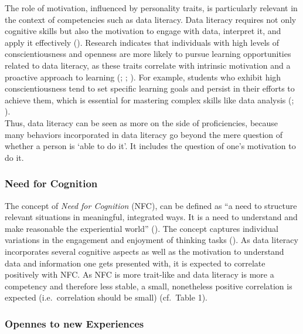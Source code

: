 \documentclass[
  12pt,
  a4paper,
  twoside]{article}
\begin{document}
The role of motivation, influenced by personality traits, is particularly relevant in the context of competencies such as data literacy.
Data literacy requires not only cognitive skills but also the motivation to engage with data, interpret it, and apply it effectively ().
Research indicates that individuals with high levels of conscientiousness and openness are more likely to pursue learning opportunities related to data literacy, as these traits correlate with intrinsic motivation and a proactive approach to learning (; ; ).
For example, students who exhibit high conscientiousness tend to set specific learning goals and persist in their efforts to achieve them, which is essential for mastering complex skills like data analysis (; ).\\
Thus, data literacy can be seen as more on the side of proficiencies, because many behaviors incorporated in data literacy go beyond the mere question of whether a person is `able to do it'. It includes the question of one's motivation to do it.

\subsubsection{Need for Cognition}\label{need-for-cognition}

The concept of \emph{Need for Cognition} (NFC), can be defined as ``a need to structure relevant situations in meaningful, integrated ways. It is a need to understand and make reasonable the experiential world'' (). The concept captures individual variations in the engagement and enjoyment of thinking tasks (). As data literacy incorporates several cognitive aspects as well as the motivation to understand data and information one gets presented with, it is expected to correlate positively with NFC. As NFC is more trait-like and data literacy is more a competency and therefore less stable, a small, nonetheless positive correlation is expected (i.e.~correlation should be small) (cf.~Table 1).

\subsubsection{Opennes to new Experiences}\label{opennes-to-new-experiences}
\end{document}
